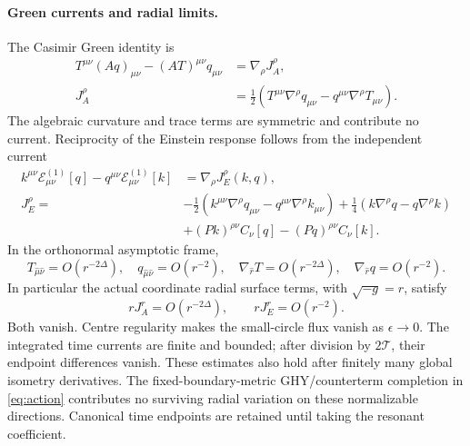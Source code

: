 \documentclass[11pt,a4paper]{article}
\numberwithin{equation}{section}
\theoremstyle{remark}\newtheorem{remark}[theorem]{Remark}
\begin{document}
\paragraph{Green currents and radial limits.}
The Casimir Green identity is
\begin{align}
 T^{\mu\nu}(Aq)_{\mu\nu}-(AT)^{\mu\nu}q_{\mu\nu}
 &=\nabla_\rho J_A^\rho,\nonumber\\
 J_A^\rho&=\frac12\left(T^{\mu\nu}\nabla^\rho q_{\mu\nu}
              -q^{\mu\nu}\nabla^\rho T_{\mu\nu}\right).
 \label{eq:casimircurrent}
\end{align}
The algebraic curvature and trace terms are symmetric and contribute no current. Reciprocity of the Einstein response follows from the independent current
\begin{align}
 k^{\mu\nu}\mathcal E^{(1)}_{\mu\nu}[q]
 -q^{\mu\nu}\mathcal E^{(1)}_{\mu\nu}[k]
 &=\nabla_\rho J_E^\rho(k,q),\nonumber\\
 J_E^\rho={}&-\frac12(k^{\mu\nu}\nabla^\rho q_{\mu\nu}
                  -q^{\mu\nu}\nabla^\rho k_{\mu\nu})
 +\frac14(k\nabla^\rho q-q\nabla^\rho k)\nonumber\\
 &+(Pk)^{\rho\nu}C_\nu[q]-(Pq)^{\rho\nu}C_\nu[k].
 \label{eq:einsteincurrent}
\end{align}
In the orthonormal asymptotic frame,
\begin{equation}
 T_{\hat\mu\hat\nu}=O(r^{-2\Delta}),\quad
 q_{\hat\mu\hat\nu}=O(r^{-2}),\quad
 \nabla_{\hat r}T=O(r^{-2\Delta}),\quad
 \nabla_{\hat r}q=O(r^{-2}).
\end{equation}
In particular the actual coordinate radial surface terms, with $\sqrt{-g}=r$, satisfy
\begin{equation}
 rJ_A^r=O(r^{-2\Delta}),\qquad
 rJ_E^r=O(r^{-2}).
 \label{eq:radialbounds}
\end{equation}
Both vanish. Centre regularity makes the small-circle flux vanish as $\epsilon\to0$. The integrated time currents are finite and bounded; after division by $2\mathcal T$, their endpoint differences vanish. These estimates also hold after finitely many global isometry derivatives. The fixed-boundary-metric GHY/counterterm completion in \eqref{eq:action} contributes no surviving radial variation on these normalizable directions. Canonical time endpoints are retained until taking the resonant coefficient.
\end{document}
